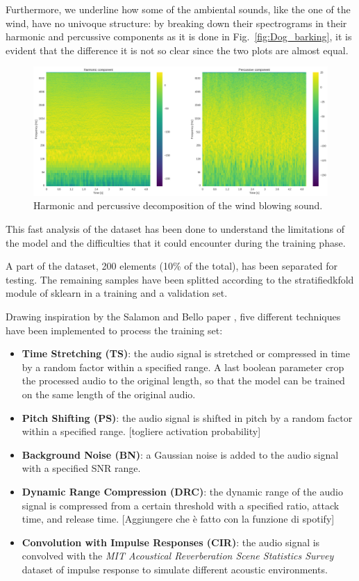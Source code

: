 \documentclass{article}
\begin{document}
\begin{sloppy}
Furthermore, we underline how some of the ambiental sounds, like the one of the wind, have no univoque structure: by breaking down their
spectrograms in their harmonic and percussive components as it is done in Fig.~\ref{fig:Dog_barking}, it is evident that the difference
it is not so clear since the two plots are almost equal.

\begin{figure}[ht]
  \centering
  \centerline{\includegraphics[width=\columnwidth]{Harmonic_Percussive_Wind.png}}
  \caption{Harmonic and percussive decomposition of the wind blowing sound.}
  \label{fig:Harmonic_Percussive_Wind}
\end{figure}

This fast analysis of the dataset has been done to understand the limitations of the model and the difficulties that it could encounter during the training phase.

A part of the dataset, 200 elements (10\% of the total), has been separated for testing. The remaining samples have been splitted according to the stratifiedkfold module of sklearn \cite{scikit-learn_stratifiedkfold} in a training and a validation set.

Drawing inspiration by the Salamon and Bello paper \cite{salamon2017deep}, five different techniques have been implemented to process the training set:
\begin{itemize}
    \item \textbf{Time Stretching (TS)}: the audio signal is stretched or compressed in time by a random factor within a specified range. A last boolean parameter crop the processed audio to the original length, so that the model can be trained on the same length of the original audio.
    \item \textbf{Pitch Shifting (PS)}: the audio signal is shifted in pitch by a random factor within a specified range. [togliere activation probability]
    \item \textbf{Background Noise (BN)}: a Gaussian noise is added to the audio signal with a specified SNR range.
    \item \textbf{Dynamic Range Compression (DRC)}: the dynamic range of the audio signal is compressed from a certain threshold with a specified ratio, attack time, and release time. [Aggiungere che è fatto con la funzione di spotify]
    \item \textbf{Convolution with Impulse Responses (CIR)}: the audio signal is convolved with the \textit{MIT Acoustical Reverberation Scene Statistics Survey} dataset of impulse response \cite{traer2016statistics} to simulate different acoustic environments.
\end{itemize}


\end{sloppy}
\end{document}
